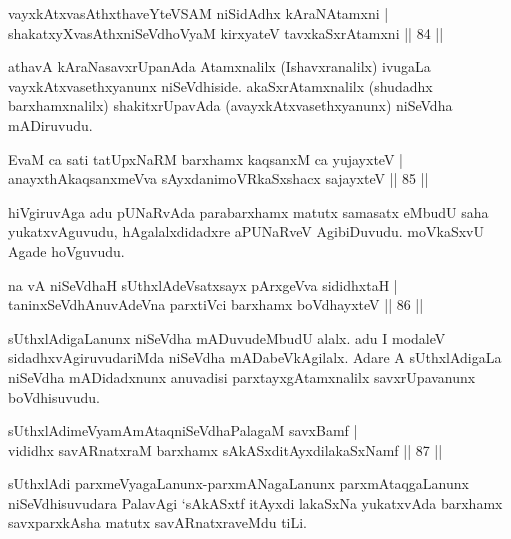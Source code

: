 \begin{shl}
vayxkAtxvasAthx\s thaveYteVSAM niSidAdhx kAraNAtamxni |\\
shakatxyXvasAthxniSeVdhoV\s yaM kirxyateV tavxkaSxrAtamxni \hfill || 84 ||
\end{shl}

\begin{artha}
athavA kAraNasavxrUpanAda Atamxnalilx (Ishavxranalilx) ivugaLa vayxkAtxvasethxyanunx niSeVdhiside. akaSxrAtamxnalilx (shudadhx barxhamxnalilx) shakitxrUpavAda (avayxkAtxvasethxyanunx) niSeVdha mADiruvudu.
\end{artha}


\begin{shl}
EvaM ca sati tatUpxNaRM barxhamx kaqsanxM ca yujayxteV |\\
anayxthA\s kaqsanxmeVva sAyxdanimoVRkaSxshacx sajayxteV \hfill || 85 ||
\end{shl}

\begin{artha}
hiVgiruvAga adu pUNaRvAda parabarxhamx matutx samasatx eMbudU saha yukatxvAguvudu, hAgalalxdidadxre aPUNaRveV AgibiDuvudu. moVkaSxvU Agade hoVguvudu. 
\end{artha}


\begin{shl}
na vA niSeVdhaH sUthxlAdeVsatxsayx pArxgeVva sididhxtaH |\\
taninxSeVdhAnuvAdeVna parxtiVci barxhamx boVdhayxteV \hfill || 86 ||
\end{shl}

\begin{artha}
sUthxlAdigaLanunx niSeVdha mADuvudeMbudU alalx. adu I modaleV sidadhxvAgiruvudariMda niSeVdha mADabeVkAgilalx. Adare A sUthxlAdigaLa niSeVdha mADidadxnunx anuvadisi parxtayxgAtamxnalilx savxrUpavanunx boVdhisuvudu.
\end{artha}

\begin{shl}
sUthxlAdimeVyamAmAtaqniSeVdhaPalagaM savxBamf |\\
vididhx savARnatxraM barxhamx sAkASxditAyxdilakaSxNamf \hfill || 87 ||
\end{shl}

\begin{artha}
sUthxlAdi parxmeVyagaLanunx-parxmANagaLanunx parxmAtaqgaLanunx niSeVdhisuvudara PalavAgi `sAkASxtf itAyxdi lakaSxNa yukatxvAda barxhamx savxparxkAsha matutx savARnatxraveMdu tiLi.
\end{artha}

